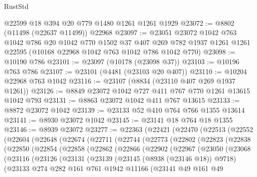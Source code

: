 \begin{lexlean}{RustStd}
\begin{coremodule}
    @22599
    @18
    @394
    @20
    @779
    @1480
    @1261
    @1261
    @1929
@23072 := @8802 (@11498 (@22637 @11499)) @22968
@23097 := @23051
    @23072
    @1042
    @763
    @1042
    @786
    @20
    @1042
    @770
    @1502
    @37
    @407
    @269
    @782
    @1937
    @1261
    @1261
    @22595
    (@10168 @22968 @1042 @763 @1042 @786 @1042 @770)
@23098 := @10190 @786
@23101 := @23097 (@10178 (@23098 @37))
@23103 := @10196 @763 @786
@23107 := @23101 (@4481 (@23103 @20 @407))
@23110 := @10204 @22968 @763 @1042
@23116 := @23107 (@8834 (@23110 @407 @269 @1937 @1261))
@23126 := @8849 @23072 @1042 @727 @411 @767 @770 @1261 @13615 @1042 @793
@23131 := @8863 @23072 @1042 @411 @767 @13615
@23133 := @8872 @23072 @1042
@23139 := @23133 @52 @410 @764 @766 @1355 @13614
@23141 := @8930 @23072 @1042
@23145 := @23141 @18 @764 @18 @1355
@23146 := @8939 @23072
@23277 := @22363
    (@22421
      (@22470
        (@22513
          (@22552
            (@22604
              (@22648
                (@22674
                  (@22711
                    (@22744
                      (@22773
                        (@22802
                          (@22823
                            (@22838
                              (@22850
                                (@22854
                                  (@22858
                                    (@22862
                                      (@22866
                                        (@22902
                                          (@22967
                                            (@23050
                                              (@23068
                                                (@23116
                                                  (@23126
                                                    (@23131
                                                      (@23139
                                                        (@23145 (@8938 (@23146 @18)) @9718)
                                                        (@23133
                                                          @274
                                                          @282
                                                          @161
                                                          @761
                                                          @1942
                                                          @11166
                                                          (@23141
                                                            @49
                                                            @161
                                                            @49

\end{coremodule}
\end{lexlean}
